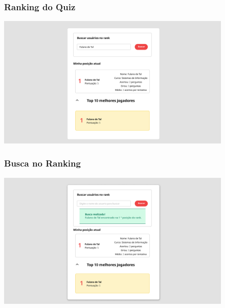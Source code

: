 \documentclass{article}
\begin{document}
\begin{figure}
	\subsubsection{Ranking do Quiz}
  	\includegraphics[width=\textwidth,  keepaspectratio]{imagens/Rank}
	\vspace{30pt}  	
  	
  	\subsubsection{Busca no Ranking}
  	\includegraphics[width=\textwidth,  keepaspectratio]{imagens/Rank_busca}
	 	
\end{figure}
\end{document}
